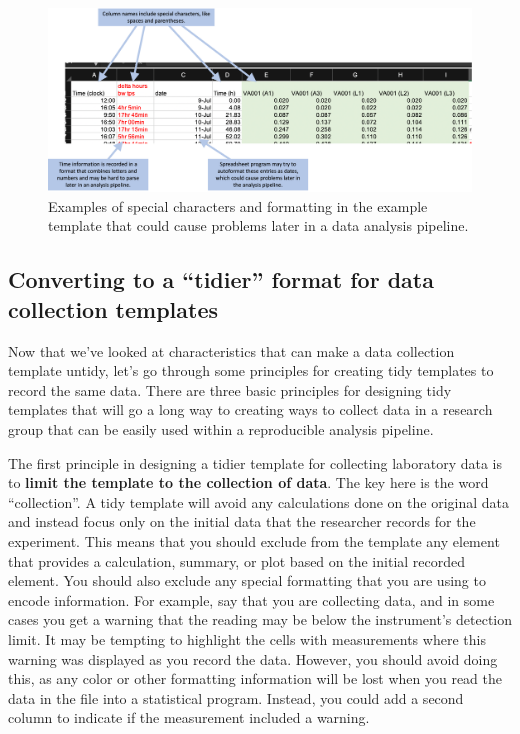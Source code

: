 \documentclass[]{tufte-book}
\begin{document}
\begin{figure}
\includegraphics[width=\textwidth]{figures/growth_curve_formatting} \caption[Examples of special characters and formatting in the example template that could cause problems later in a data analysis pipeline]{Examples of special characters and formatting in the example template that could cause problems later in a data analysis pipeline.}\label{fig:growthformatting}
\end{figure}

\subsection{Converting to a ``tidier'' format for data collection templates}\label{converting-to-a-tidier-format-for-data-collection-templates}

Now that we've looked at characteristics that can make a data collection
template untidy, let's go through some principles for creating tidy templates to
record the same data. There are three basic principles for designing tidy
templates that will go a long way to creating ways to collect data in a research
group that can be easily used within a reproducible analysis pipeline.

The first principle in designing a tidier template for collecting laboratory
data is to \textbf{limit the template to the collection of data}. The key here is the
word ``collection''. A tidy template will avoid any calculations done on the
original data and instead focus only on the initial data that the researcher
records for the experiment. This means that you should exclude from the template
any element that provides a calculation, summary, or plot based on the initial
recorded element. You should also exclude any special formatting that you are
using to encode information. For example, say that you are collecting data, and
in some cases you get a warning that the reading may be below the instrument's
detection limit. It may be tempting to highlight the cells with measurements
where this warning was displayed as you record the data. However, you should
avoid doing this, as any color or other formatting information will be lost when
you read the data in the file into a statistical program. Instead, you could add
a second column to indicate if the measurement included a warning.
\end{document}
